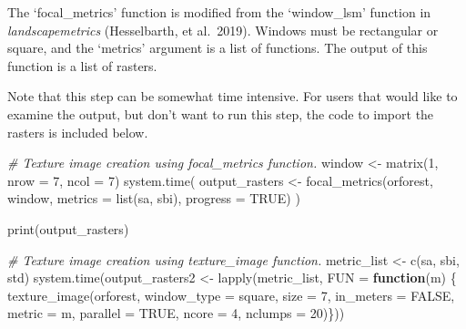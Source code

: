 \documentclass[
]{article}
\newenvironment{Shaded}{\begin{snugshade}}{\end{snugshade}}
\newcommand{\AttributeTok}[1]{\textcolor[rgb]{0.77,0.63,0.00}{#1}}
\newcommand{\CommentTok}[1]{\textcolor[rgb]{0.56,0.35,0.01}{\textit{#1}}}
\newcommand{\ConstantTok}[1]{\textcolor[rgb]{0.00,0.00,0.00}{#1}}
\newcommand{\ControlFlowTok}[1]{\textcolor[rgb]{0.13,0.29,0.53}{\textbf{#1}}}
\newcommand{\DecValTok}[1]{\textcolor[rgb]{0.00,0.00,0.81}{#1}}
\newcommand{\FunctionTok}[1]{\textcolor[rgb]{0.00,0.00,0.00}{#1}}
\newcommand{\NormalTok}[1]{#1}
\newcommand{\OtherTok}[1]{\textcolor[rgb]{0.56,0.35,0.01}{#1}}
\newcommand{\StringTok}[1]{\textcolor[rgb]{0.31,0.60,0.02}{#1}}
\begin{document}
The `focal\_metrics' function is modified from the `window\_lsm'
function in \emph{landscapemetrics} (Hesselbarth, et al.~2019). Windows
must be rectangular or square, and the `metrics' argument is a list of
functions. The output of this function is a list of rasters.

Note that this step can be somewhat time intensive. For users that would
like to examine the output, but don't want to run this step, the code to
import the rasters is included below.

\begin{Shaded}
\begin{Highlighting}[]
\CommentTok{\# Texture image creation using \textquotesingle{}focal\_metrics\textquotesingle{} function.}
\NormalTok{window }\OtherTok{\textless{}{-}} \FunctionTok{matrix}\NormalTok{(}\DecValTok{1}\NormalTok{, }\AttributeTok{nrow =} \DecValTok{7}\NormalTok{, }\AttributeTok{ncol =} \DecValTok{7}\NormalTok{)}
\FunctionTok{system.time}\NormalTok{(}
\NormalTok{output\_rasters }\OtherTok{\textless{}{-}} \FunctionTok{focal\_metrics}\NormalTok{(orforest, window, }
                                \AttributeTok{metrics =} \FunctionTok{list}\NormalTok{(}\StringTok{\textquotesingle{}sa\textquotesingle{}}\NormalTok{, }\StringTok{\textquotesingle{}sbi\textquotesingle{}}\NormalTok{), }
                                \AttributeTok{progress =} \ConstantTok{TRUE}\NormalTok{)}
\NormalTok{)}

\FunctionTok{print}\NormalTok{(output\_rasters)}

\CommentTok{\# Texture image creation using \textquotesingle{}texture\_image\textquotesingle{} function.}
\NormalTok{metric\_list }\OtherTok{\textless{}{-}} \FunctionTok{c}\NormalTok{(}\StringTok{\textquotesingle{}sa\textquotesingle{}}\NormalTok{, }\StringTok{\textquotesingle{}sbi\textquotesingle{}}\NormalTok{, }\StringTok{\textquotesingle{}std\textquotesingle{}}\NormalTok{)}
\FunctionTok{system.time}\NormalTok{(output\_rasters2 }\OtherTok{\textless{}{-}} \FunctionTok{lapply}\NormalTok{(metric\_list, }\AttributeTok{FUN =} \ControlFlowTok{function}\NormalTok{(m) \{}
  \FunctionTok{texture\_image}\NormalTok{(orforest, }\AttributeTok{window\_type =} \StringTok{\textquotesingle{}square\textquotesingle{}}\NormalTok{, }\AttributeTok{size =} \DecValTok{7}\NormalTok{,}
                                \AttributeTok{in\_meters =} \ConstantTok{FALSE}\NormalTok{, }\AttributeTok{metric =}\NormalTok{ m, }
                                \AttributeTok{parallel =} \ConstantTok{TRUE}\NormalTok{, }\AttributeTok{ncore =} \DecValTok{4}\NormalTok{, }\AttributeTok{nclumps =} \DecValTok{20}\NormalTok{)\}))}
\end{Highlighting}
\end{Shaded}
\end{document}
